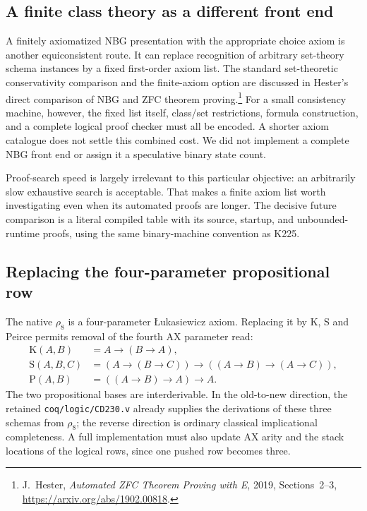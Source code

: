 \subsection{A finite class theory as a different front end}

A finitely axiomatized NBG presentation with the appropriate choice
axiom is another equiconsistent route.  It can replace recognition of
arbitrary set-theory schema instances by a fixed first-order axiom
list.  The standard set-theoretic conservativity comparison and the
finite-axiom option are discussed in Hester's direct comparison of
NBG and ZFC theorem proving.\footnote{J.~Hester,
\emph{Automated ZFC Theorem Proving with E}, 2019,
Sections~2--3, \url{https://arxiv.org/abs/1902.00818}.}
For a small consistency machine, however, the fixed list itself,
class/set restrictions, formula construction, and a complete logical
proof checker must all be encoded.  A shorter axiom catalogue does
not settle this combined cost.  We did not implement a complete NBG
front end or assign it a speculative binary state count.

Proof-search speed is largely irrelevant to this particular objective:
an arbitrarily slow exhaustive search is acceptable.  That makes a
finite axiom list worth investigating even when its automated proofs
are longer.  The decisive future comparison is a literal compiled
table with its source, startup, and unbounded-runtime proofs, using
the same binary-machine convention as K225.

\subsection{Replacing the four-parameter propositional row}

The native $\rho_8$ is a four-parameter \L ukasiewicz axiom.  Replacing
it by K, S and Peirce permits removal of the fourth AX parameter read:
\begin{align*}
 \mathrm K(A,B)&=A\to(B\to A),\\
 \mathrm S(A,B,C)&=(A\to(B\to C))\to((A\to B)\to(A\to C)),\\
 \mathrm P(A,B)&=((A\to B)\to A)\to A.
\end{align*}
The two propositional bases are interderivable.  In the old-to-new
direction, the retained \texttt{coq/logic/CD230.v} already supplies
the derivations of these three schemas from $\rho_8$; the reverse
direction is ordinary classical implicational completeness.  A full
implementation must also update AX arity and the stack locations of
the logical rows, since one pushed row becomes three.

